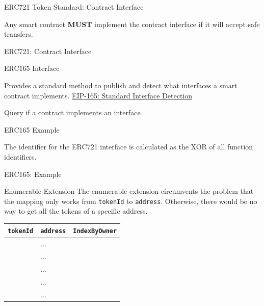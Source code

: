 \documentclass[]{beamer}
\begin{document}
\begin{frame}{ERC721 Token Standard: Contract Interface}

Any smart contract \textbf{MUST} implement the contract interface if it will accept safe transfers.
\vspace{1em}
	\begin{samplecode}{ERC721: Contract Interface}
		
	\end{samplecode}
\end{frame}

\begin{frame}{ERC165 Interface}

Provides a standard method to publish and detect what interfaces a smart contract implements. \link \href{https://eips.ethereum.org/EIPS/eip-165}{EIP-165: Standard Interface Detection}
\vspace{1em}
	\begin{samplecode}{Query if a contract implements an interface}
			
	\end{samplecode}
\end{frame}


\begin{frame}{ERC165 Example}

The identifier for the ERC721 interface is calculated as the XOR of all function identifiers.
\vspace{0.5em}
\begin{samplecode}{ERC165: Example}
		
\end{samplecode}
\end{frame}

\begin{frame}{Enumerable Extension}
The enumerable extension circumvents the problem that the mapping only works from \texttt{tokenId} to \texttt{address}. Otherwise, there would be no way to get all the tokens of a specific address.
\vspace{0.5em}
		\begin{table}
			\begin{tabular}{clc}
			\hline \hline
			\texttt{tokenId} & \texttt{address} & \texttt{IndexByOwner}\\
			\hline
			\color{focus}{0} & \color{focus}{0x0901}... & \color{focus}{0} \\
			\color{mint}{1} & \color{mint}{0x7A25}... & \color{mint}{0} \\
			\color{focus}{2} & \color{focus}{0x0901}... & \color{focus}{1}\\
			\color{focus}{3} & \color{focus}{0x0901}... & \color{focus}{2}\\
			\color{darkmint}{4} & \color{darkmint}{0xce9b}... & \color{darkmint}{0} \\
			\hline \hline
			\end{tabular}
		\end{table}
\end{frame}
\end{document}
